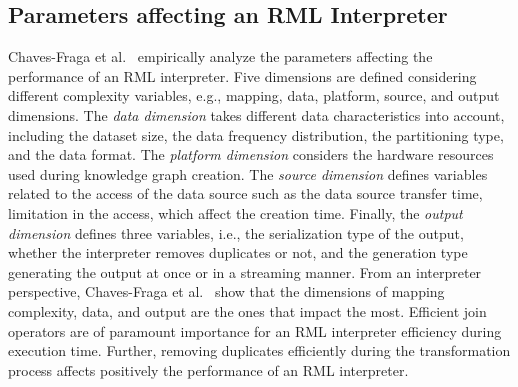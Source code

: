 \subsection{Parameters affecting an RML Interpreter}
Chaves-Fraga et al.~\citep{Chaves-FragaEIC19} empirically analyze the parameters affecting the performance of an RML interpreter.
Five dimensions are defined considering different complexity variables, e.g., mapping, data, platform, source, and output dimensions.
The \emph{data dimension} takes different data characteristics into account, including the dataset size, the data frequency distribution, the partitioning type, and the data format.
The \emph{platform dimension} considers the hardware resources used during knowledge graph creation.
The \emph{source dimension} defines variables related to the access of the data source such as the data source transfer time, limitation in the access, which affect the creation time.
Finally, the \emph{output dimension} defines three variables, i.e., the serialization type of the output, whether the interpreter removes duplicates or not, and the generation type generating the output at once or in a streaming manner.
From an interpreter perspective, Chaves-Fraga et al.~\citep{Chaves-FragaEIC19} show that the dimensions of mapping complexity, data, and output are the ones that impact the most.
Efficient join operators are of paramount importance for an RML interpreter efficiency during execution time.
Further, removing duplicates efficiently during the transformation process affects positively the performance of an RML interpreter.
